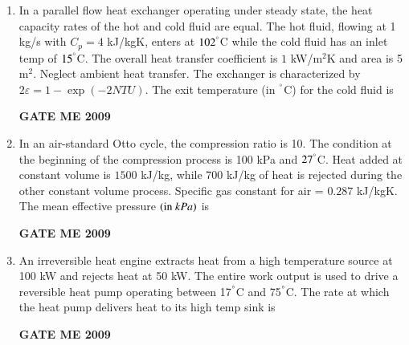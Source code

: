 \documentclass[journal]{IEEEtran}
\begin{document}
\begin{enumerate}[leftmargin=0pt]
\item In a parallel flow heat exchanger operating under steady state, the heat capacity rates of the hot and cold fluid are equal. The hot fluid, flowing at 1 kg/s with $C_p = 4$ kJ/kgK, enters at $102^\degree$C while the cold fluid has an inlet temp of $15^\degree$C. The overall heat transfer coefficient is $1$ kW/m$^2$K and area is 5 m$^2$. Neglect ambient heat transfer. The exchanger is characterized by $2\varepsilon = 1 - \exp(-2 NTU)$. The exit temperature (in $^\degree$C) for the cold fluid is
\begin{enumerate}
\hfill{\textbf{GATE ME 2009}}
\end{enumerate}

\item In an air-standard Otto cycle, the compression ratio is 10. The condition at the beginning of the compression process is 100 kPa and $27^\degree$C. Heat added at constant volume is $1500$ kJ/kg, while $700$ kJ/kg of heat is rejected during the other constant volume process. Specific gas constant for air = $0.287$ kJ/kgK. The mean effective pressure $\left(\text{in} \ kPa\right)$ is
\begin{enumerate}
\hfill{\textbf{GATE ME 2009}}
\end{enumerate}

\item An irreversible heat engine extracts heat from a high temperature source at 100 kW and rejects heat at 50 kW. The entire work output is used to drive a reversible heat pump operating between 17$^\degree$C and 75$^\degree$C. The rate  at which the heat pump delivers heat to its high temp sink is
\begin{enumerate}
\hfill{\textbf{GATE ME 2009}}
\end{enumerate}


\end{enumerate}
\end{document}
